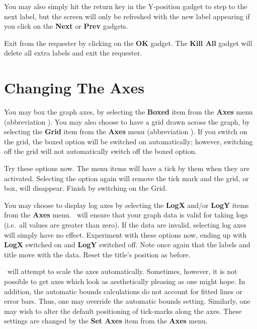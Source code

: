 \noindent You may also simply hit the return key in the Y-position gadget to step to the next
label, but the screen will only be refreshed with the new label appearing if you
click on the {\bf Next} or {\bf Prev} gadgets.

Exit from the requester by clicking on the {\bf OK} gadget. The {\bf Kill 
All} gadget will delete all extra labels and exit the requester.







\section{Changing The Axes}
You may box the graph axes, by selecting the {\bf Boxed}
item from the {\bf Axes} menu (abbreviation ). You may also choose 
to have a grid drawn across the graph, by selecting the {\bf Grid} 
item from the {\bf Axes} menu (abbreviation ). If you switch on the grid, the 
boxed option will be switched on automatically; however, switching off the grid will 
not automatically switch off the boxed option.

Try these options now. The menu items will have a tick by them when they are 
activated. Selecting the option again will remove the tick mark and the grid, or box, 
will disappear. Finish by switching on the Grid.

You may choose to display log axes  by selecting the {\bf LogX} 
and/or {\bf LogY} items from the {\bf Axes} menu. \amplot\ will ensure that your 
graph data is valid for taking logs (i.e.\ all values are greater than zero). If the 
data are invalid, selecting log axes will simply have no effect.
Experiment with these options now, 
ending up with {\bf LogX} switched on and {\bf LogY} switched off. Note once again 
that the labels and title move with the data. Reset the title's position as before.


\amplot\ will attempt to scale the axes automatically. 
Sometimes, however, it is 
not possible to get axes which look as aesthetically pleasing as one might hope.
In addition, the automatic bounds calculations do not account for fitted lines or 
error bars. 
Thus, one may override the automatic bounds setting. Similarly, one may wish to 
alter the default positioning of tick-marks along the axes.
These settings are changed by the {\bf Set Axes} item from the {\bf Axes} menu.

